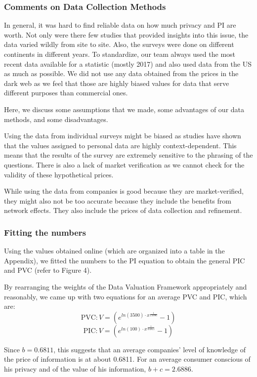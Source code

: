 \documentclass{icmmcm}
\begin{document}
\subsubsection{Comments on Data Collection Methods}
In general, it was hard to find reliable data on how much privacy and PI are worth. Not only were there few studies that provided insights into this issue, the data varied wildly from site to site. Also, the surveys were done on different continents in different years. To standardize, our team always used the most recent data available for a statistic (mostly 2017) and also used data from the US as much as possible. We did not use any data obtained from the prices in the dark web as we feel that those are highly biased values for data that serve different purposes than commercial ones.

Here, we discuss some assumptions that we made, some advantages of our data methods, and some disadvantages.

Using the data from individual surveys might be biased as studies have shown that the values assigned to personal data are highly context-dependent. This means that the results of the survey are extremely sensitive to the phrasing of the questions. There is also a lack of market verification as we cannot check for the validity of these hypothetical prices.
\citep{classify_data}

While using the data from companies is good because they are market-verified, they might also not be too accurate because they include the benefits from network effects. They also include the prices of data collection and refinement. \citep{OCED}

\subsubsection{Fitting the numbers}
\label{subsubsec:PVCPIC}
Using the values obtained online (which are organized into a table in the Appendix), we fitted the numbers to the PI equation to obtain the general PIC and PVC (refer to Figure 4).

By rearranging the weights of the Data Valuation Framework appropriately and reasonably, we came up with two equations for an average PVC and PIC, which are:\\
$$ \text{PVC}: V =(e^{ln(3500) \cdot x^{\frac{1}{2.6886}}}-1)$$
$$ \text{PIC}: V =(e^{ln(100) \cdot x^{\frac{1}{0.6811}}}-1)$$

Since $b = 0.6811$, this suggests that an average companies' level of knowledge of the price of information is at about 0.6811.
For an average consumer conscious of his privacy and of the value of his information, $b+c = 2.6886$. 
\end{document}
